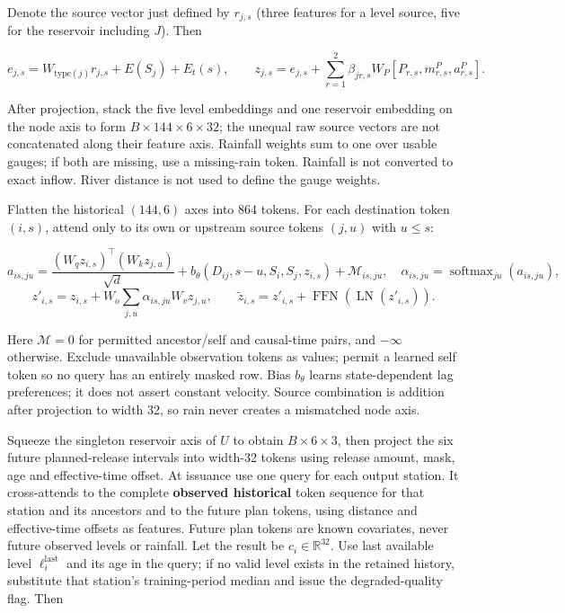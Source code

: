 \documentclass[
  10pt,
  a4paper,
]{article}
\begin{document}
Denote the source vector just defined by \(r_{j,s}\) (three features for
a level source, five for the reservoir including \(J\)). Then

\[e_{j,s}=W_{\mathrm{type}(j)}r_{j,s}+E(S_j)+E_t(s),\qquad z_{j,s}=e_{j,s}+\sum_{r=1}^2\beta_{jr,s}W_P[P_{r,s},m^P_{r,s},a^P_{r,s}].\]

After projection, stack the five level embeddings and one reservoir
embedding on the node axis to form \(B\times144\times6\times32\); the
unequal raw source vectors are not concatenated along their feature
axis. Rainfall weights sum to one over usable gauges; if both are
missing, use a missing-rain token. Rainfall is not converted to exact
inflow. River distance is not used to define the gauge weights.

Flatten the historical \((144,6)\) axes into 864 tokens. For each
destination token \((i,s)\), attend only to its own or upstream source
tokens \((j,u)\) with \(u\le s\):

\[a_{is,ju}=\frac{(W_qz_{i,s})^\top(W_kz_{j,u})}{\sqrt d}+b_\theta(D_{ij},s-u,S_i,S_j,z_{i,s})+\mathcal M_{is,ju},\quad \alpha_{is,ju}=\operatorname{softmax}_{ju}(a_{is,ju}),\]
\[z'_{i,s}=z_{i,s}+W_o\sum_{j,u}\alpha_{is,ju}W_vz_{j,u},\qquad \widetilde z_{i,s}=z'_{i,s}+\operatorname{FFN}(\operatorname{LN}(z'_{i,s})).\]

Here \(\mathcal M=0\) for permitted ancestor/self and causal-time pairs,
and \(-\infty\) otherwise. Exclude unavailable observation tokens as
values; permit a learned self token so no query has an entirely masked
row. Bias \(b_\theta\) learns state-dependent lag preferences; it does
not assert constant velocity. Source combination is addition after
projection to width 32, so rain never creates a mismatched node axis.

Squeeze the singleton reservoir axis of \(U\) to obtain
\(B\times6\times3\), then project the six future planned-release
intervals into width-32 tokens using release amount, mask, age and
effective-time offset. At issuance use one query for each output
station. It cross-attends to the complete \textbf{observed historical}
token sequence for that station and its ancestors and to the future plan
tokens, using distance and effective-time offsets as features. Future
plan tokens are known covariates, never future observed levels or
rainfall. Let the result be \(c_i\in\mathbb R^{32}\). Use last available
level \(\ell_i^{\mathrm{last}}\) and its age in the query; if no valid
level exists in the retained history, substitute that station's
training-period median and issue the degraded-quality flag. Then
\end{document}
